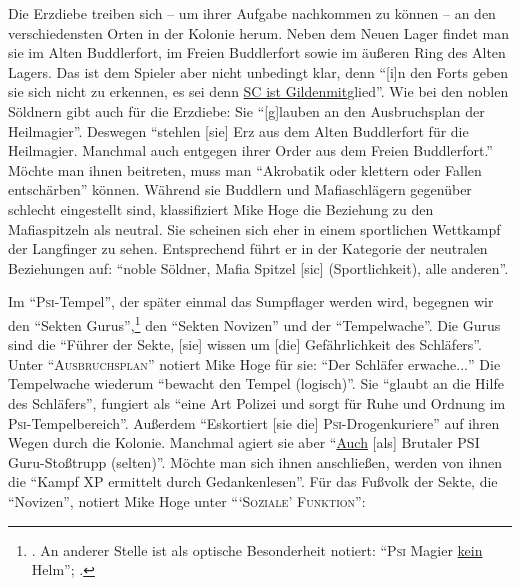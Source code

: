 \documentclass[a5paper,pagesize,numbers=noenddot]{scrbook}
\begin{document}
Die Erzdiebe treiben sich -- um ihrer Aufgabe nachkommen zu können -- an den verschiedensten Orten in der Kolonie herum.
Neben dem Neuen Lager findet man sie im Alten Buddlerfort, im Freien Buddlerfort sowie im äußeren Ring des Alten Lagers.
Das ist dem Spieler aber nicht unbedingt klar, denn \enquote{[i]n den Forts geben sie sich nicht zu erkennen, es sei denn \uline{SC ist Gildenmit}glied}.
Wie bei den noblen Söldnern gibt auch für die Erzdiebe:
Sie \enquote{[g]lauben an den Ausbruchsplan der Heilmagier}.
Deswegen \enquote{stehlen [sie] Erz aus dem Alten Buddlerfort für die Heilmagier.
Manchmal auch entgegen ihrer Order aus dem Freien Buddlerfort.}
Möchte man ihnen beitreten, muss man \enquote{Akrobatik oder klettern oder Fallen entschärben} können.\autocite[S.~9]{orpheus_gildensystem}
Während sie Buddlern und Mafiaschlägern gegenüber schlecht eingestellt sind, klassifiziert Mike Hoge die Beziehung zu den Mafiaspitzeln als neutral.
Sie scheinen sich eher in einem sportlichen Wettkampf der Langfinger zu sehen.
Entsprechend führt er in der Kategorie der neutralen Beziehungen auf:
\enquote{noble Söldner, Mafia Spitzel [sic] (Sportlichkeit), alle anderen}.\autocite[S.~9]{orpheus_gildensystem}




Im \enquote{\textsc{Psi}-Tempel}, der später einmal das Sumpflager werden wird, begegnen wir den \enquote{Sekten Gurus},\footnote{\autocite[S.~11]{orpheus_gildensystem}. An anderer Stelle ist als optische Besonderheit notiert: \enquote{\textsc{Psi} Magier \uline{kein} Helm}; \autocite[S.~7]{orpheus_b_scribbles}.} den \enquote{Sekten Novizen}\autocite[S.~10]{orpheus_gildensystem} und der \enquote{Tempelwache}.\autocite[S.~12]{orpheus_gildensystem}
Die Gurus sind die \enquote{Führer der Sekte, [sie] wissen um [die] Gefährlichkeit des Schläfers}.
Unter \enquote{\textsc{Ausbruchsplan}} notiert Mike Hoge für sie: \enquote{Der Schläfer erwache$\ldots$}
Die Tempelwache wiederum \enquote{bewacht den Tempel (logisch)}.
Sie \enquote{glaubt an die Hilfe des Schläfers}, fungiert als \enquote{eine Art Polizei und sorgt für Ruhe und Ordnung im \textsc{Psi}-Tempelbereich}.
Außerdem \enquote{Eskortiert [sie die] \textsc{Psi}-Drogenkuriere} auf ihren Wegen durch die Kolonie.
Manchmal agiert sie aber \enquote{\uline{Auch} [als] Brutaler \textsc{PSI} Guru-Stoßtrupp (selten)}.
Möchte man sich ihnen anschließen, werden von ihnen die \enquote{Kampf XP ermittelt durch Gedankenlesen}.
Für das Fußvolk der Sekte, die \enquote{Novizen}, notiert Mike Hoge unter \enquote{\enquote{\textsc{Soziale}} \textsc{Funktion}}:
\end{document}
